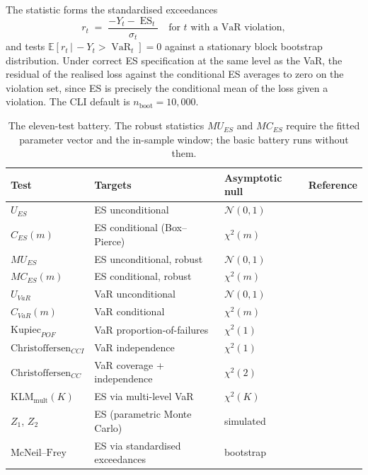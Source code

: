 \documentclass[11pt,a4paper]{article}
\newcommand{\VaR}{\operatorname{VaR}}
\newcommand{\ES}{\operatorname{ES}}
\newcommand{\E}{\mathbb{E}}
\newcommand{\given}{\,|\,}
\theoremstyle{plain}
\begin{document}
The \citet{mcneil_frey_2000} statistic forms the standardised
exceedances
\begin{equation}
  r_t \;=\; \frac{-Y_t - \ES_t}{\sigma_t}
  \quad \text{for } t \text{ with a VaR violation},
  \label{eq:mcneil-frey}
\end{equation}
and tests $\E[r_t \given -Y_t > \VaR_t] = 0$ against a stationary block
bootstrap distribution. Under correct ES specification at the same
level as the VaR, the residual of the realised loss against the
conditional ES averages to zero on the violation set, since ES is
precisely the conditional mean of the loss given a violation. The
CLI default is $n_{\text{boot}} = 10{,}000$.

\begin{table}[ht]
\centering
\caption{The eleven-test battery. The robust statistics
$MU_{ES}$ and $MC_{ES}$ require the fitted parameter vector and
the in-sample window; the basic battery runs without them.}
\label{tab:battery}
\small
\begin{tabular}{@{}llll@{}}
\toprule
\textbf{Test} & \textbf{Targets} & \textbf{Asymptotic null} & \textbf{Reference} \\
\midrule
$U_{ES}$              & ES unconditional             & $\mathcal{N}(0,1)$ & \citealt{du_escanciano_2017} \\
$C_{ES}(m)$           & ES conditional (Box--Pierce) & $\chi^2(m)$        & \citealt{du_escanciano_2017} \\
$MU_{ES}$             & ES unconditional, robust     & $\mathcal{N}(0,1)$ & \citealt{du_escanciano_2017} \\
$MC_{ES}(m)$          & ES conditional, robust       & $\chi^2(m)$        & \citealt{du_escanciano_2017} \\
$U_{VaR}$             & VaR unconditional            & $\mathcal{N}(0,1)$ & \citealt{du_escanciano_2017} \\
$C_{VaR}(m)$          & VaR conditional              & $\chi^2(m)$        & \citealt{du_escanciano_2017} \\
$\mathrm{Kupiec}_{POF}$       & VaR proportion-of-failures   & $\chi^2(1)$        & \citealt{kupiec_1995} \\
$\mathrm{Christoffersen}_{CCI}$ & VaR independence             & $\chi^2(1)$        & \citealt{christoffersen_1998} \\
$\mathrm{Christoffersen}_{CC}$  & VaR coverage + independence  & $\chi^2(2)$        & \citealt{christoffersen_1998} \\
$\mathrm{KLM}_{\text{mult}}(K)$ & ES via multi-level VaR       & $\chi^2(K)$        & \citealt{kratz_lok_mcneil_2018} \\
$Z_1$, $Z_2$          & ES (parametric Monte Carlo)  & simulated          & \citealt{acerbi_szekely_2014} \\
$\mathrm{McNeil}\text{--}\mathrm{Frey}$ & ES via standardised exceedances & bootstrap & \citealt{mcneil_frey_2000} \\
\bottomrule
\end{tabular}
\end{table}
\end{document}
